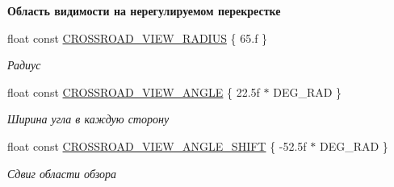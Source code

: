 \begin{Indent}\textbf{ Область видимости на нерегулируемом перекрестке}\par
\begin{DoxyCompactItemize}
\item 
\mbox{\label{namespacertm_ae5df71baa1c995b0418d8e22252ba6fa}} 
float const \hyperlink{namespacertm_ae5df71baa1c995b0418d8e22252ba6fa}{C\+R\+O\+S\+S\+R\+O\+A\+D\+\_\+\+V\+I\+E\+W\+\_\+\+R\+A\+D\+I\+US} \{ 65.f \}
\begin{DoxyCompactList}\small\item\em Радиус \end{DoxyCompactList}\item 
\mbox{\label{namespacertm_a5b9c1ba0abe7dd1259bc4c34a0022cda}} 
float const \hyperlink{namespacertm_a5b9c1ba0abe7dd1259bc4c34a0022cda}{C\+R\+O\+S\+S\+R\+O\+A\+D\+\_\+\+V\+I\+E\+W\+\_\+\+A\+N\+G\+LE} \{ 22.\+5f $\ast$ D\+E\+G\+\_\+\+R\+A\+D \}
\begin{DoxyCompactList}\small\item\em Ширина угла в каждую сторону \end{DoxyCompactList}\item 
\mbox{\label{namespacertm_ae04c779dfc5b406c04ff9a549423c910}} 
float const \hyperlink{namespacertm_ae04c779dfc5b406c04ff9a549423c910}{C\+R\+O\+S\+S\+R\+O\+A\+D\+\_\+\+V\+I\+E\+W\+\_\+\+A\+N\+G\+L\+E\+\_\+\+S\+H\+I\+FT} \{ -\/52.\+5f $\ast$ D\+E\+G\+\_\+\+R\+A\+D \}
\begin{DoxyCompactList}\small\item\em Сдвиг области обзора \end{DoxyCompactList}\end{DoxyCompactItemize}
\end{Indent}
